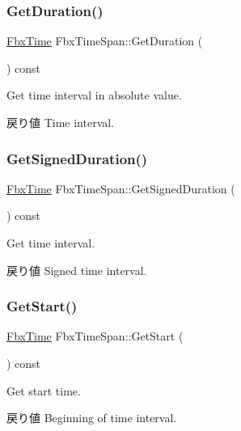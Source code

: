 \subsubsection{\texorpdfstring{Get\+Duration()}{GetDuration()}}
{\footnotesize\ttfamily \hyperlink{class_fbx_time}{Fbx\+Time} Fbx\+Time\+Span\+::\+Get\+Duration (\begin{DoxyParamCaption}{ }\end{DoxyParamCaption}) const}

Get time interval in absolute value. \begin{DoxyReturn}{戻り値}
Time interval. 
\end{DoxyReturn}
\mbox{\label{class_fbx_time_span_a73c72bdec019e41044aa6f4afb59fef3}} 
\subsubsection{\texorpdfstring{Get\+Signed\+Duration()}{GetSignedDuration()}}
{\footnotesize\ttfamily \hyperlink{class_fbx_time}{Fbx\+Time} Fbx\+Time\+Span\+::\+Get\+Signed\+Duration (\begin{DoxyParamCaption}{ }\end{DoxyParamCaption}) const}

Get time interval. \begin{DoxyReturn}{戻り値}
Signed time interval. 
\end{DoxyReturn}
\mbox{\label{class_fbx_time_span_a262c2fedcf2bdf205554df6fc8c7f7b9}} 
\subsubsection{\texorpdfstring{Get\+Start()}{GetStart()}}
{\footnotesize\ttfamily \hyperlink{class_fbx_time}{Fbx\+Time} Fbx\+Time\+Span\+::\+Get\+Start (\begin{DoxyParamCaption}{ }\end{DoxyParamCaption}) const}

Get start time. \begin{DoxyReturn}{戻り値}
Beginning of time interval. 
\end{DoxyReturn}
\mbox{\label{class_fbx_time_span_a1d5362bd784ccd554a2c6faad2227c9b}} 
